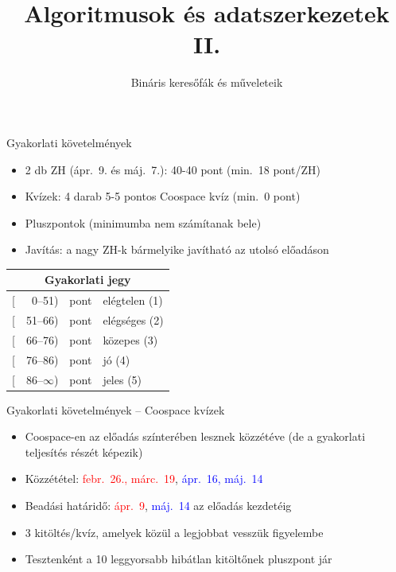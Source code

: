 \documentclass{beamer}
\institute{Szegedi Tudományegyetem}
\title{Algoritmusok és adatszerkezetek II.}
\subtitle{Bináris keresőfák és műveleteik}
\date{}
\begin{document}
\maketitle

\begin{frame}{Gyakorlati követelmények}
	\begin{itemize}
		\item 2 db ZH (ápr.~9. és máj.~7.): 40-40 pont (min.~18 pont/ZH)
		\item Kvízek: 4 darab 5-5 pontos Coospace kvíz (min.~0 pont)
		\item Pluszpontok (minimumba nem számítanak bele)
		\item Javítás: a nagy ZH-k bármelyike javítható az utolsó előadáson
	\end{itemize}
	\pause
	\begin{table}
	\centering
	\begin{tabular}{r@{}r@{ }l|l}
		\multicolumn{4}{c}{Gyakorlati jegy} \\ \hline
		{[}&0--51)  & pont & elégtelen (1) \\
		{[}&51--66) & pont & elégséges (2) \\
		{[}&66--76) & pont & közepes (3) \\
		{[}&76--86) & pont & jó (4) \\
		{[}&86--$\infty$) & pont & jeles (5)
	\end{tabular}
    \end{table}
\end{frame}

\begin{frame}{Gyakorlati követelmények -- Coospace kvízek}
	\begin{itemize}
		\item Coospace-en az előadás színterében lesznek közzétéve (de a gyakorlati teljesítés részét képezik)
		\item Közzététel: \textcolor{red}{febr.~26., márc.~19}, \textcolor{blue}{ápr.~16, máj.~14}
		\item Beadási határidő: \textcolor{red}{ápr.~9}, \textcolor{blue}{máj.~14} az előadás kezdetéig
		\item 3 kitöltés/kvíz, amelyek közül a legjobbat vesszük figyelembe
		\pause
		\item Tesztenként a 10 leggyorsabb hibátlan kitöltőnek pluszpont jár
	\end{itemize}
\end{frame}
\end{document}
